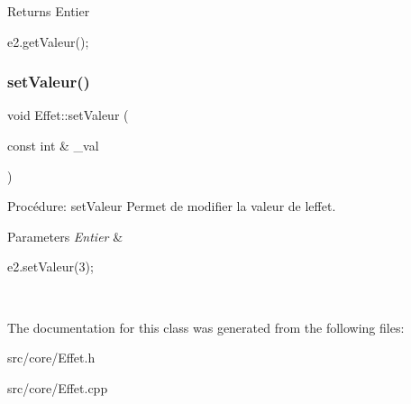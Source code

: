 \begin{DoxyReturn}{Returns}
Entier 
\begin{DoxyCode}
e2.getValeur();
\end{DoxyCode}
 
\end{DoxyReturn}
\mbox{\label{classEffet_a3d22eeba4c86d9f45e75d64e639d4e37}} 
\subsubsection{\texorpdfstring{set\+Valeur()}{setValeur()}}
{\footnotesize\ttfamily void Effet\+::set\+Valeur (\begin{DoxyParamCaption}\item[{const int \&}]{\+\_\+val }\end{DoxyParamCaption})}



Procédure\+: set\+Valeur Permet de modifier la valeur de l\textquotesingle{}effet. 


\begin{DoxyParams}{Parameters}
{\em Entier} & 
\begin{DoxyCode}
e2.setValeur(3);
\end{DoxyCode}
 \\
\hline
\end{DoxyParams}


The documentation for this class was generated from the following files\+:\begin{DoxyCompactItemize}
\item 
src/core/Effet.\+h\item 
src/core/Effet.\+cpp\end{DoxyCompactItemize}
